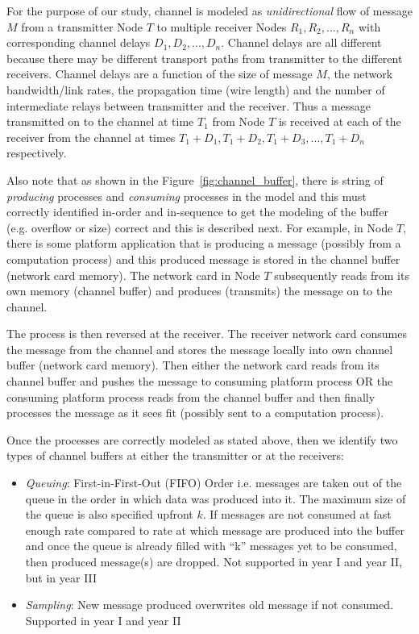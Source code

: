 For the purpose of our study, channel is modeled as \emph{unidirectional} flow of message $M$ from a transmitter Node $T$ to multiple receiver Nodes $R_1,R_2,...,R_n$ with corresponding channel delays $D_1,D_2,...,D_n$. Channel delays are all different because there may be different transport paths from transmitter to the different receivers. Channel delays are a function of the size of message $M$, the network bandwidth/link rates, the propagation time (wire length) and the number of intermediate relays between transmitter and the receiver. Thus a message transmitted on to the channel at time $T_1$ from Node $T$ is received at each of the receiver from the channel at times $T_1+D_1, T_1+D_2, T_1+D_3,...,T_1+D_n$ respectively.

Also note that as shown in the Figure~\ref{fig:channel_buffer}, there is string of \emph{producing} processes and \emph{consuming} processes in the model and this must correctly identified in-order and in-sequence to get the modeling of the buffer (e.g. overflow or size) correct and this is described next. For example, in Node $T$, there is some platform application that is producing a message (possibly from a computation process) and this produced message is stored in the channel buffer (network card memory). The network card in Node $T$ subsequently reads from its own memory (channel buffer) and produces (transmits) the message on to the channel. 

The process is then reversed at the receiver. The receiver network card consumes the message from the channel and stores the message locally into own channel buffer (network card memory). Then either the network card reads from its channel buffer and pushes the message to consuming platform process OR the consuming platform process reads from the channel buffer and then finally processes the message as it sees fit (possibly sent to a computation process).

Once the processes are correctly modeled as stated above, then we identify two types of channel buffers at either the transmitter or at the receivers:
\begin{itemize}
\item \emph{Queuing}: First-in-First-Out (FIFO) Order i.e. messages are taken out of the queue in the order in which data was produced into it.  The maximum size of the queue is also specified upfront $k$. If messages are not consumed at fast enough rate compared to rate at which message are produced into the buffer and once the queue is already filled with   “k” messages yet to be consumed, then produced message(s) are dropped. Not supported in year I and year II, but in year III

\item \emph{Sampling}: New message produced overwrites old message if not consumed. Supported in year I and year II

\end{itemize}
